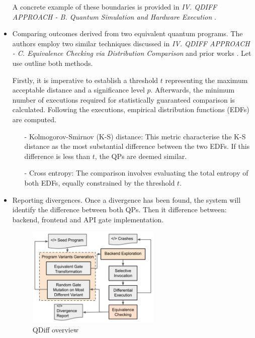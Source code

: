 \begin{itemize}
    A concrete example of these boundaries is provided in \textit{IV. QDIFF APPROACH - B. Quantum Simulation and Hardware Execution} \cite{wang2021qdiff}.

    \item Comparing outcomes derived from two equivalent quantum programs. The authors employ two similar techniques discussed in \textit{IV. QDIFF APPROACH - C. Equivalence Checking via Distribution Comparison} \cite{wang2021qdiff} and prior works \cite{chan2014optimal}\cite{aaronson2016complexity}\cite{cross2019validating}. Let use outline both methods.\newline
    
    Firstly, it is imperative to establish a threshold $t$ representing the maximum acceptable distance and a significance level $p$. Afterwards, the minimum number of executions required for statistically guaranteed comparison is calculated. Following the executions, empirical distribution functions (EDFs) are computed.

    \begin{itemize}
        \item[-] Kolmogorov-Smirnov (K-S) distance: This metric characterise the K-S distance as the most substantial difference between the two EDFs. If this difference is less than $t$, the QPs are deemed similar.
        \item[-] Cross entropy: The comparison involves evaluating the total entropy of both EDFs, equally constrained by the threshold $t$.
    \end{itemize}

    \item Reporting divergences. Once a divergence has been found, the system will identify the difference between both QPs. Then it difference between: backend, frontend and API gate implementation.
    
    \begin{figure}[H]
        \centering
        \includegraphics[width=0.6\textwidth]{TFM/photos/QDiffWorkoverflow.png}
        \caption{QDiff overview \cite{wang2021qdiff}} 
        \label{Fig:QDiffWorkOverflow}
    \end{figure}


\end{itemize}
